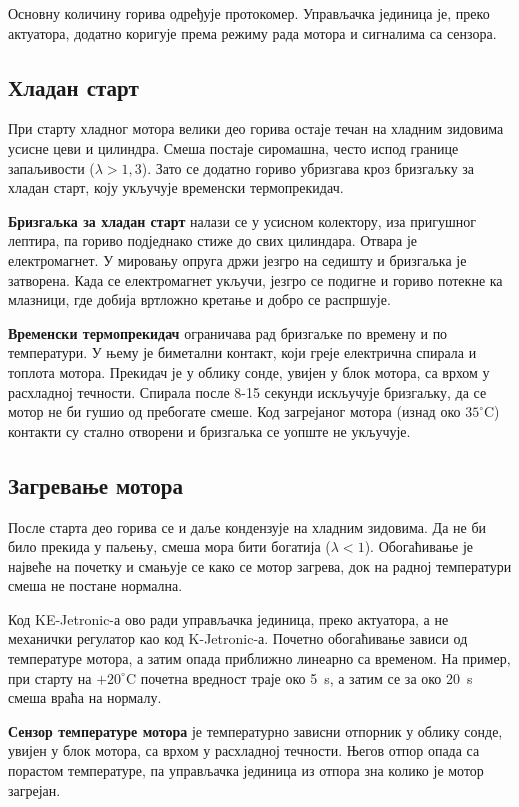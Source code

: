 \documentclass{report}
\begin{document}
Основну количину горива одређује протокомер. Управљачка јединица је, преко
актуатора, додатно коригује према режиму рада мотора и сигналима са сензора.

\subsection{Хладан старт}

При старту хладног мотора велики део горива остаје течан на хладним зидовима
усисне цеви и цилиндра. Смеша постаје сиромашна, често испод границе
запаљивости ($\lambda > 1{,}3$). Зато се додатно гориво убризгава кроз
бризгаљку за хладан старт, коју укључује временски термопрекидач.

\textbf{Бризгаљка за хладан старт} налази се у усисном колектору, иза
пригушног лептира, па гориво подједнако стиже до свих цилиндара. Отвара је
електромагнет. У мировању опруга држи језгро на седишту и бризгаљка је
затворена. Када се електромагнет укључи, језгро се подигне и гориво потекне
ка млазници, где добија вртложно кретање и добро се распршује.

\textbf{Временски термопрекидач} ограничава рад бризгаљке по времену и по
температури. У њему је биметални контакт, који греје електрична спирала и
топлота мотора. Прекидач је у облику сонде, увијен у блок мотора, са врхом у
расхладној течности. Спирала после 8-15 секунди искључује бризгаљку, да се мотор не
би гушио од пребогате смеше. Код загрејаног мотора (изнад око $35^\circ$C)
контакти су стално отворени и бризгаљка се уопште не укључује.

\subsection{Загревање мотора}

После старта део горива се и даље кондензује на хладним зидовима. Да не би
било прекида у паљењу, смеша мора бити богатија ($\lambda < 1$). Обогаћивање
је највеће на почетку и смањује се како се мотор загрева, док на радној
температури смеша не постане нормална.

Код KE-Jetronic-а ово ради управљачка јединица, преко актуатора, а не
механички регулатор као код K-Jetronic-а. Почетно обогаћивање зависи од
температуре мотора, а затим опада приближно линеарно са временом. На пример,
при старту на $+20^\circ$C почетна вредност траје око 5~s, а затим се за око
20~s смеша враћа на нормалу.

\textbf{Сензор температуре мотора} је температурно зависни отпорник у облику сонде, увијен у
блок мотора, са врхом у расхладној течности. Његов отпор опада са порастом
температуре, па управљачка јединица из отпора зна колико је мотор загрејан.
\end{document}
